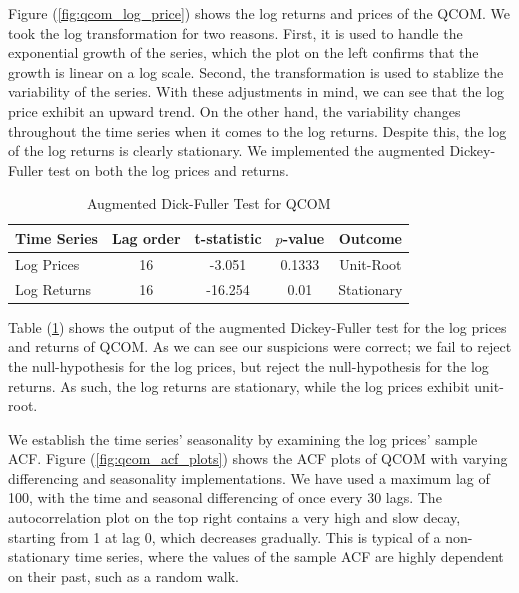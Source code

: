 \documentclass[12pt]{article}
\begin{document}
Figure (\ref{fig:qcom_log_price}) shows the log returns and prices of the QCOM. We took the log transformation for two reasons. First, it is used to handle the exponential growth of the series, which the plot on the left confirms that the growth is linear on a log scale. Second, the transformation is used to stablize the variability of the series. With these adjustments in mind, we can see that the log price exhibit an upward trend. On the other hand, the variability changes throughout the time series when it comes to the log returns. Despite this, the log of the log returns is clearly stationary. We implemented the augmented Dickey-Fuller test on both the log prices and returns.
\begin{table}[ht]
	\centering
	\caption{Augmented Dick-Fuller Test for QCOM}
	\begin{tabular}[t]{lcccc}
		\toprule
		Time Series &Lag order& t-statistic & $p$-value & Outcome  \\
		\midrule
		Log Prices & 16 & -3.051 & 0.1333 & Unit-Root  \\				
		Log Returns & 16 & -16.254 & 0.01 & Stationary  \\				
		\bottomrule
	\end{tabular}\label{tab:adftest}
\end{table}
Table (\ref{tab:adftest}) shows the output of the augmented Dickey-Fuller test for the log prices and returns of QCOM. As we can see our suspicions were correct; we fail to reject the null-hypothesis for the log prices, but reject the null-hypothesis for the log returns. As such, the log returns are stationary, while the log prices exhibit unit-root.

We establish the time series' seasonality by examining the log prices' sample ACF. Figure (\ref{fig:qcom_acf_plots}) shows the ACF plots of QCOM with varying differencing and seasonality implementations. We have used a maximum lag of 100, with the time and seasonal differencing of once every 30 lags. The autocorrelation plot on the top right contains a very high and slow decay, starting from 1 at lag 0, which decreases gradually. This is typical of a non-stationary time series, where the values of the sample ACF are highly dependent on their past, such as a random walk.
\end{document}
